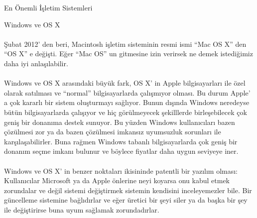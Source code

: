 \documentclass[10pt,a5paper]{book}
\begin{document}
\begin{section}{En Önemli İşletim Sistemleri}
\begin{subsection}{Windows ve OS X}
\paragraph{}{Şubat 2012' den beri, Macintosh işletim sisteminin resmi ismi “Mac OS X” den “OS X” e değişti. Eğer “Mac OS” un gitmesine izin verirsek ne demek istediğimiz daha iyi anlaşılabilir.}
\paragraph{}{Windows ve OS X arasındaki büyük fark, OS X' in Apple bilgisayarları ile özel olarak satılması ve “normal” bilgisayarlarda çalışmıyor olması. Bu durum Apple' a çok kararlı bir sistem oluşturmayı sağlıyor. Bunun dışında Windows neredeyse bütün bilgisayarlarda çalışıyor ve hiç görülmeyecek şekilllerde birleşebilecek çok geniş bir donanıma destek sunuyor. Bu yüzden Windows kullanıcıları bazen çözülmesi zor ya da bazen çözülmesi imkansız uyumsuzluk sorunları ile karşılaşabilirler.  Buna rağmen Windows tabanlı bilgisayarlarda çok geniş bir donanım seçme imkanı bulunur ve böylece fiyatlar daha uygun seviyeye iner.}
\paragraph{}{Windows ve OS X' in benzer noktaları ikisininde patentli bir yazılım olması: Kullanıcılar Microsoft ya da Apple önlerine neyi koyarsa onu kabul etmek zorundalar ve değil sistemi değiştirmek sistemin kendisini inceleyemezler bile. Bir güncelleme sistemine bağlıdırlar ve eğer üretici bir şeyi siler ya da başka bir şey ile değiştirirse buna uyum sağlamak zorundadırlar.}

\end{subsection}
\end{section}
\end{document}
